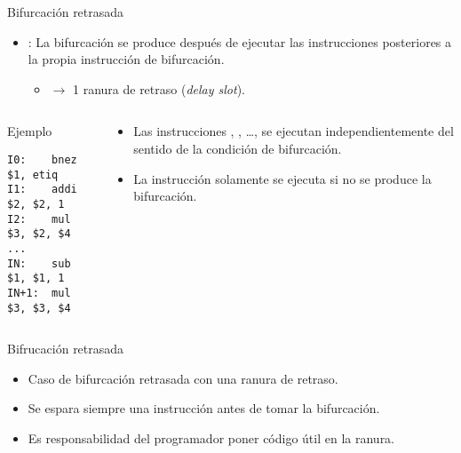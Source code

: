 \begin{frame}[t,fragile]{Bifurcación retrasada}
\begin{itemize}
  \item {}: La bifurcación se produce después de ejecutar 
        las  instrucciones posteriores a la propia instrucción 
        de bifurcación.
    \begin{itemize}
      \item {} $\rightarrow$ 
            1 ranura de retraso (\emph{delay slot}).
    \end{itemize}
\end{itemize}

\begin{columns}
\begin{column}{.4\textwidth}
\begin{block}{Ejemplo}
\begin{lstlisting}[language={generalasm}]
I0:    bnez $1, etiq
I1:    addi $2, $2, 1
I2:    mul  $3, $2, $4
...
IN:    sub  $1, $1, 1
IN+1:  mul  $3, $3, $4

\end{lstlisting}
\end{block}
\end{column}

\begin{column}{.6\textwidth}
\begin{itemize}
  \item Las instrucciones , , \ldots,  se
        ejecutan independientemente del sentido de la condición de bifurcación.
  \item La instrucción  solamente se ejecuta si no se produce la
        bifurcación.
\end{itemize}
\end{column}
\end{columns}
\end{frame}

\begin{frame}[t]{Bifrucación retrasada}
\makebox[\textwidth][c]{

}
\begin{itemize}
  \item Caso de bifurcación retrasada con una ranura de retraso.
  \item Se espara siempre una instrucción antes de tomar la bifurcación.
  \item Es responsabilidad del programador poner código útil en la ranura.
\end{itemize}
\end{frame}

